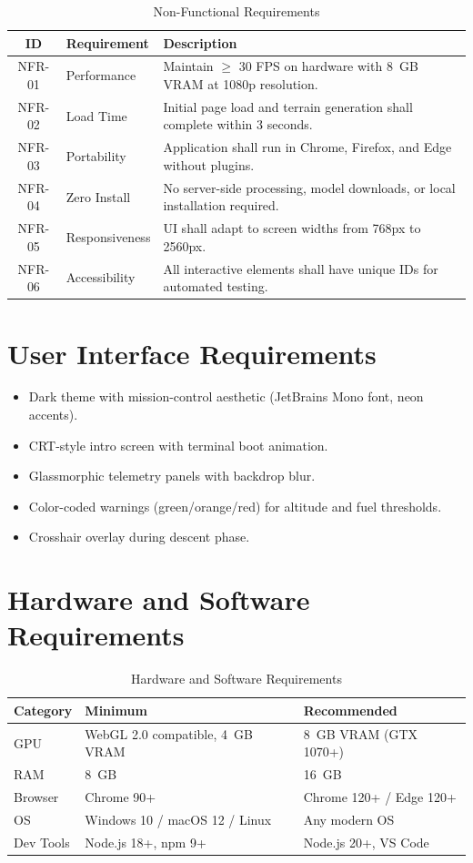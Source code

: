 \begin{table}[h]
\centering
\caption{Non-Functional Requirements}
\label{tab:nonfunc_req}
\begin{tabular}{|c|p{3cm}|p{8.5cm}|}
\hline
\textbf{ID} & \textbf{Requirement} & \textbf{Description} \\
\hline
NFR-01 & Performance & Maintain $\geq$ 30 FPS on hardware with 8~GB VRAM at 1080p resolution. \\
\hline
NFR-02 & Load Time & Initial page load and terrain generation shall complete within 3 seconds. \\
\hline
NFR-03 & Portability & Application shall run in Chrome, Firefox, and Edge without plugins. \\
\hline
NFR-04 & Zero Install & No server-side processing, model downloads, or local installation required. \\
\hline
NFR-05 & Responsiveness & UI shall adapt to screen widths from 768px to 2560px. \\
\hline
NFR-06 & Accessibility & All interactive elements shall have unique IDs for automated testing. \\
\hline
\end{tabular}
\end{table}

\section{User Interface Requirements}
\begin{itemize}
    \item Dark theme with mission-control aesthetic (JetBrains Mono font, neon accents).
    \item CRT-style intro screen with terminal boot animation.
    \item Glassmorphic telemetry panels with backdrop blur.
    \item Color-coded warnings (green/orange/red) for altitude and fuel thresholds.
    \item Crosshair overlay during descent phase.
\end{itemize}

\section{Hardware and Software Requirements}

\begin{table}[h]
\centering
\caption{Hardware and Software Requirements}
\label{tab:hw_sw}
\begin{tabular}{|p{3cm}|p{5cm}|p{5cm}|}
\hline
\textbf{Category} & \textbf{Minimum} & \textbf{Recommended} \\
\hline
GPU & WebGL 2.0 compatible, 4~GB VRAM & 8~GB VRAM (GTX 1070+) \\
\hline
RAM & 8~GB & 16~GB \\
\hline
Browser & Chrome 90+ & Chrome 120+ / Edge 120+ \\
\hline
OS & Windows 10 / macOS 12 / Linux & Any modern OS \\
\hline
Dev Tools & Node.js 18+, npm 9+ & Node.js 20+, VS Code \\
\hline
\end{tabular}
\end{table}

